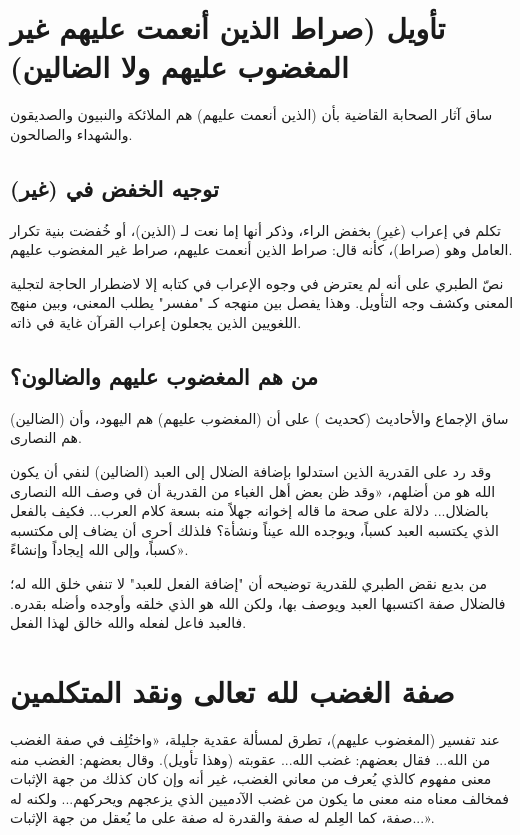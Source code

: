 \separator

\section{تأويل (صراط الذين أنعمت عليهم غير المغضوب عليهم ولا الضالين)}
ساق  آثار الصحابة القاضية بأن (الذين أنعمت عليهم) هم الملائكة والنبيون والصديقون والشهداء والصالحون. 

\subsection{توجيه الخفض في (غير)}
تكلم  في إعراب (غيرِ) بخفض الراء، وذكر أنها إما نعت لـ (الذين)، أو خُفضت بنية تكرار العامل وهو (صراط)، كأنه قال: صراط الذين أنعمت عليهم، صراط غير المغضوب عليهم.

\begin{fawaid}
نصّ الطبري على أنه لم يعترض في وجوه الإعراب في كتابه إلا لاضطرار الحاجة لتجلية المعنى وكشف وجه التأويل. وهذا يفصل بين منهجه كـ "مفسر" يطلب المعنى، وبين منهج اللغويين الذين يجعلون إعراب القرآن غاية في ذاته.
\end{fawaid}

\subsection{من هم المغضوب عليهم والضالون؟}
ساق  الإجماع والأحاديث (كحديث ) على أن (المغضوب عليهم) هم اليهود، وأن (الضالين) هم النصارى.

وقد رد  على القدرية الذين استدلوا بإضافة الضلال إلى العبد (الضالين) لنفي أن يكون الله هو من أضلهم،  «وقد ظن بعض أهل الغباء من القدرية أن في وصف الله النصارى بالضلال... دلالة على صحة ما قاله إخوانه جهلاً منه بسعة كلام العرب... فكيف بالفعل الذي يكتسبه العبد كسباً، ويوجده الله عيناً ونشأة؟ فلذلك أحرى أن يضاف إلى مكتسبه كسباً، وإلى الله إيجاداً وإنشاءً».

\begin{fawaid}
من بديع نقض الطبري للقدرية توضيحه أن "إضافة الفعل للعبد" لا تنفي خلق الله له؛ فالضلال صفة اكتسبها العبد ويوصف بها، ولكن الله هو الذي خلقه وأوجده وأضله بقدره. فالعبد فاعل لفعله والله خالق لهذا الفعل.
\end{fawaid}

\separator

\section{صفة الغضب لله تعالى ونقد المتكلمين}
عند تفسير (المغضوب عليهم)، تطرق  لمسألة عقدية جليلة،  «واختُلِف في صفة الغضب من الله... فقال بعضهم: غضب الله... عقوبته (وهذا تأويل). وقال بعضهم: الغضب منه معنى مفهوم كالذي يُعرف من معاني الغضب، غير أنه وإن كان كذلك من جهة الإثبات فمخالف معناه منه معنى ما يكون من غضب الآدميين الذي يزعجهم ويحركهم... ولكنه له صفة، كما العِلم له صفة والقدرة له صفة على ما يُعقل من جهة الإثبات...».

